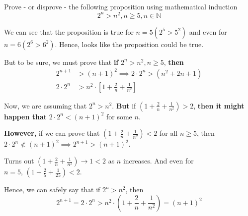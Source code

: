 
\question[3] Prove - or disprove - the following proposition using mathematical induction 
\[ 2^n > n^2, n\geq 5, n\in\mathbb{N} \]

\insertQR{}

\begin{solution}[\halfpage]
  We can see that the proposition is true for $n=5 (2^5 > 5^2)$ and even for 
  $n=6 (2^6 > 6^2)$. Hence, looks like the proposition could be true. 

  But to be sure, we must prove that \textbf{if} $2^n > n^2, n\geq 5$, \textbf{then}
  \begin{align}
    2^{n+1} &> (n+1)^2\implies 2\cdot 2^n > (n^2 + 2n + 1) \\
    2\cdot 2^n &> n^2\cdot\left[ 1 + \frac{2}{n} + \frac{1}{n^2} \right]
  \end{align}

  Now, we are assuming that $2^n > n^2$. \textbf{But} if $\left(1 + \frac{2}{n} + \frac{1}{n^2} \right) > 2$, 
  \textbf{then it might happen that} $2\cdot 2^n < (n+1)^2$ for some $n$. 

  \textbf{However,} if we can prove that $\left( 1 + \frac{2}{n} + \frac{1}{n^2}\right) < 2$ 
  for all $n\geq 5$, then $2\cdot 2^n \nless(n+1)^2\implies 2^{n+1} > (n+1)^2$.

  Turns out $\left( 1 + \frac{2}{n} + \frac{1}{n^2} \right)\rightarrow 1 < 2$ as $n$ increases.  
  And even for $n=5,\, \left( 1 + \frac{2}{5} + \frac{1}{25}\right) < 2$. 

  Hence, we can safely say that if $2^n > n^2$, then 
  \[ 2^{n+1} = 2\cdot 2^n > n^2\cdot\left( 1 + \frac{2}{n} + \frac{1}{n^2}\right) = (n+1)^2 \]
\end{solution}

